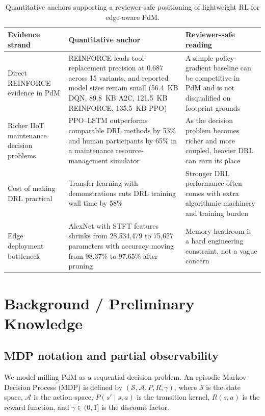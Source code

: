 \documentclass[sn-basic]{sn-jnl} %
\begin{document}
\begin{table}[t]
        \centering
        \small
        \setlength{\tabcolsep}{4pt}
        \begin{tabular}{p{} p{} p{}}
                \toprule
                Evidence strand & Quantitative anchor & Reviewer-safe reading \\
                \midrule
                Direct REINFORCE evidence in PdM & REINFORCE leads tool-replacement precision at 0.687 across 15 variants, and reported model sizes remain small (56.4~KB DQN, 89.8~KB A2C, 121.5~KB REINFORCE, 135.5~KB PPO) \cite{Siraskar2025} & A simple policy-gradient baseline can be competitive in PdM and is not disqualified on footprint grounds \\
                Richer IIoT maintenance decision problems & PPO--LSTM outperforms comparable DRL methods by 53\% and human participants by 65\% in a maintenance resource-management simulator \cite{Ong2022-01} & As the decision problem becomes richer and more coupled, heavier DRL can earn its place \\
                Cost of making DRL practical & Transfer learning with demonstrations cuts DRL training wall time by 58\% \cite{Ong2022-02} & Stronger DRL performance often comes with extra algorithmic machinery and training burden \\
                Edge deployment bottleneck & AlexNet with STFT features shrinks from 28,534,479 to 75,627 parameters with accuracy moving from 98.37\% to 97.65\% after pruning \cite{Pandey2023} & Memory headroom is a hard engineering constraint, not a vague concern \\
                \bottomrule
        \end{tabular}
        \caption{Quantitative anchors supporting a reviewer-safe positioning of lightweight RL for edge-aware PdM.}
        \label{tab:quantitative_anchors_lightweight_edge}
\end{table}
\section{Background / Preliminary Knowledge}
\subsection{MDP notation and partial observability}
We model milling PdM as a sequential decision problem. An episodic Markov Decision Process (MDP) is defined by $(\mathcal{S},\mathcal{A},P,R,\gamma)$, where $\mathcal{S}$ is the state space, $\mathcal{A}$ is the action space, $P(s'\mid s,a)$ is the transition kernel, $R(s,a)$ is the reward function, and $\gamma\in(0,1]$ is the discount factor.
\end{document}
